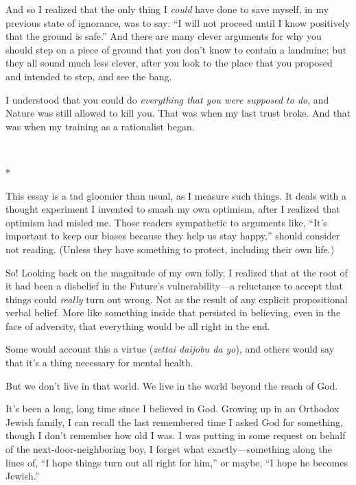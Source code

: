 {
 And so I realized that the only thing I \textit{could} have done
to save myself, in my previous state of ignorance, was to say:
``I will not proceed until I know positively that the
ground is safe.'' And there are many clever arguments
for why you should step on a piece of ground that you
don't know to contain a landmine; but they all sound
much less clever, after you look to the place that you proposed and
intended to step, and see the bang.}

{
 I understood that you could do \textit{everything that you were
supposed to do}, and Nature was still allowed to kill you. That was
when my last trust broke. And that was when my training as a
rationalist began.}

{\centering
 \ ~
\par}

{\centering
 *
\par}


{
 This essay is a tad gloomier than usual, as I measure such things.
It deals with a thought experiment I invented to smash my own optimism,
after I realized that optimism had misled me. Those readers sympathetic
to arguments like, ``It's important to
keep our biases because they help us stay happy,''
should consider not reading. (Unless they have something to protect,
including their own life.) }

{
 So! Looking back on the magnitude of my own folly, I realized that
at the root of it had been a disbelief in the Future's
vulnerability---a reluctance to accept that things could
\textit{really} turn out wrong. Not as the result of any explicit
propositional verbal belief. More like something inside that persisted
in believing, even in the face of adversity, that everything would be
all right in the end.}

{
 Some would account this a virtue (\textit{zettai daijobu da yo}),
and others would say that it's a thing necessary for
mental health.}

{
 But we don't live in that world. We live in the
world beyond the reach of God.}

{
 It's been a long, long time since I believed in
God. Growing up in an Orthodox Jewish family, I can recall the last
remembered time I asked God for something, though I
don't remember how old I was. I was putting in some
request on behalf of the next-door-neighboring boy, I forget what
exactly---something along the lines of, ``I hope
things turn out all right for him,'' or maybe,
``I hope he becomes Jewish.''}

